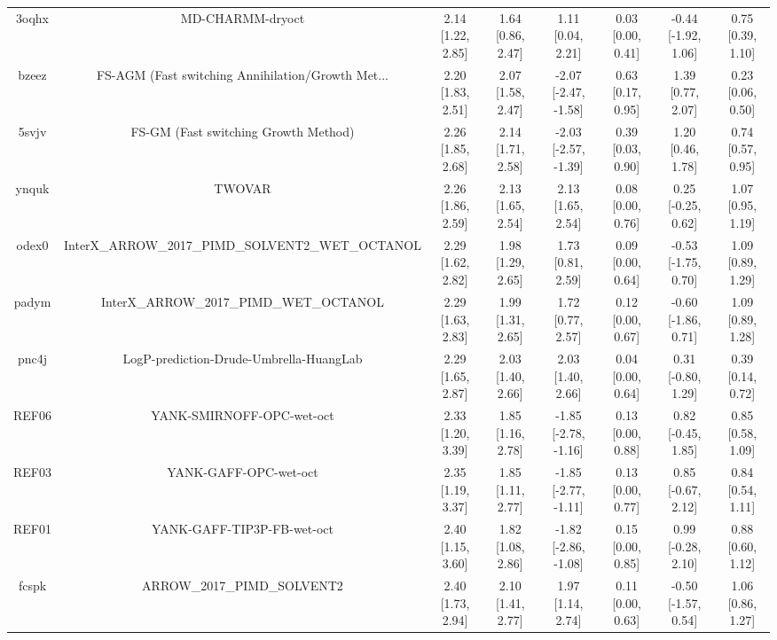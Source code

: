 \documentclass{article}
\begin{document}
\begin{center}
\begin{longtable}{|cccccccc|}
 3oqhx &                                   MD-CHARMM-dryoct &  2.14 [1.22, 2.85] &  1.64 [0.86, 2.47] &     1.11 [0.04, 2.21] &  0.03 [0.00, 0.41] &  -0.44 [-1.92, 1.06] &     0.75 [0.39, 1.10] \\
 bzeez &  FS-AGM (Fast switching Annihilation/Growth Met... &  2.20 [1.83, 2.51] &  2.07 [1.58, 2.47] &  -2.07 [-2.47, -1.58] &  0.63 [0.17, 0.95] &    1.39 [0.77, 2.07] &     0.23 [0.06, 0.50] \\
 5svjv &               FS-GM (Fast switching Growth Method) &  2.26 [1.85, 2.68] &  2.14 [1.71, 2.58] &  -2.03 [-2.57, -1.39] &  0.39 [0.03, 0.90] &    1.20 [0.46, 1.78] &     0.74 [0.57, 0.95] \\
 ynquk &                                             TWOVAR &  2.26 [1.86, 2.59] &  2.13 [1.65, 2.54] &     2.13 [1.65, 2.54] &  0.08 [0.00, 0.76] &   0.25 [-0.25, 0.62] &     1.07 [0.95, 1.19] \\
 odex0 &  InterX\_ARROW\_2017\_PIMD\_SOLVENT2\_WET\_OCTANOL &  2.29 [1.62, 2.82] &  1.98 [1.29, 2.65] &     1.73 [0.81, 2.59] &  0.09 [0.00, 0.64] &  -0.53 [-1.75, 0.70] &     1.09 [0.89, 1.29] \\
 padym &            InterX\_ARROW\_2017\_PIMD\_WET\_OCTANOL &  2.29 [1.63, 2.83] &  1.99 [1.31, 2.65] &     1.72 [0.77, 2.57] &  0.12 [0.00, 0.67] &  -0.60 [-1.86, 0.71] &     1.09 [0.89, 1.28] \\
 pnc4j &            LogP-prediction-Drude-Umbrella-HuangLab &  2.29 [1.65, 2.87] &  2.03 [1.40, 2.66] &     2.03 [1.40, 2.66] &  0.04 [0.00, 0.64] &   0.31 [-0.80, 1.29] &     0.39 [0.14, 0.72] \\
 REF06 &                          YANK-SMIRNOFF-OPC-wet-oct &  2.33 [1.20, 3.39] &  1.85 [1.16, 2.78] &  -1.85 [-2.78, -1.16] &  0.13 [0.00, 0.88] &   0.82 [-0.45, 1.85] &     0.85 [0.58, 1.09] \\
 REF03 &                              YANK-GAFF-OPC-wet-oct &  2.35 [1.19, 3.37] &  1.85 [1.11, 2.77] &  -1.85 [-2.77, -1.11] &  0.13 [0.00, 0.77] &   0.85 [-0.67, 2.12] &     0.84 [0.54, 1.11] \\
 REF01 &                         YANK-GAFF-TIP3P-FB-wet-oct &  2.40 [1.15, 3.60] &  1.82 [1.08, 2.86] &  -1.82 [-2.86, -1.08] &  0.15 [0.00, 0.85] &   0.99 [-0.28, 2.10] &     0.88 [0.60, 1.12] \\
 fcspk &                        ARROW\_2017\_PIMD\_SOLVENT2 &  2.40 [1.73, 2.94] &  2.10 [1.41, 2.77] &     1.97 [1.14, 2.74] &  0.11 [0.00, 0.63] &  -0.50 [-1.57, 0.54] &     1.06 [0.86, 1.27] \\

\end{longtable}
\end{center}
\end{document}
